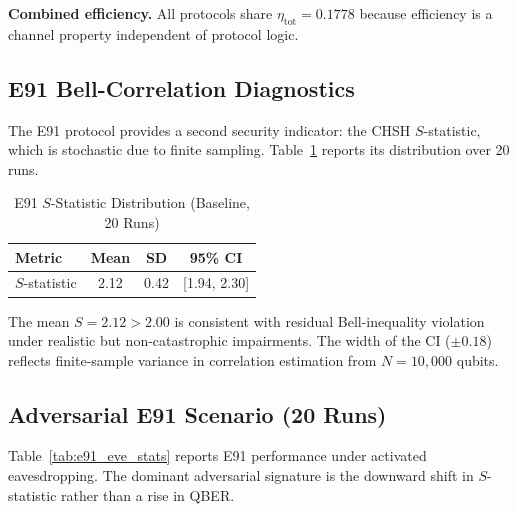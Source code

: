 \documentclass[journal]{IEEEtran}
\begin{document}
\textbf{Combined efficiency.} All protocols share $\eta_{\mathrm{tot}} = 0.1778$
because efficiency is a channel property independent of protocol logic.

\subsection{E91 Bell-Correlation Diagnostics}

The E91 protocol provides a second security indicator: the
CHSH $S$-statistic, which is stochastic due to finite sampling.
Table~\ref{tab:e91_baseline} reports its distribution over 20 runs.

\begin{table}[!t]
  \caption{E91 $S$-Statistic Distribution (Baseline, 20 Runs)}
  \label{tab:e91_baseline}
  \centering
  \footnotesize
  \begin{tabular}{lccc}
    \toprule
    Metric & Mean & SD & 95\% CI \\
    \midrule
    $S$-statistic & 2.12 & 0.42 & [1.94, 2.30] \\
    \bottomrule
  \end{tabular}
\end{table}

The mean $S = 2.12 > 2.00$ is consistent with residual Bell-inequality
violation under realistic but non-catastrophic impairments. The width of
the CI ($\pm 0.18$) reflects finite-sample variance in correlation
estimation from $N = 10{,}000$ qubits.

\subsection{Adversarial E91 Scenario (20 Runs)}

Table~\ref{tab:e91_eve_stats} reports E91 performance under activated
eavesdropping. The dominant adversarial signature is the downward shift
in $S$-statistic rather than a rise in QBER.

\begin{table}[!t]
  \caption{E91 Adversarial Scenario: Eavesdropping Enabled (20 Runs)}
  \label{tab:e91_eve_stats}
  \centering
  \footnotesize
\end{table}
\end{document}
